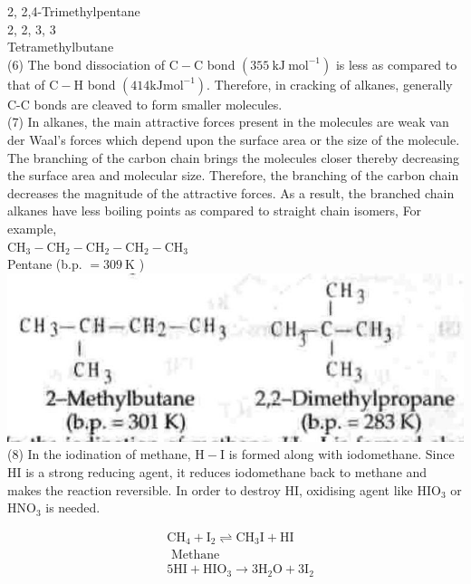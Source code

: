 \documentclass[10pt]{article}
\begin{document}
2, 2,4-Trimethylpentane\\
2, 2, 3, 3\\
Tetramethylbutane\\
(6) The bond dissociation of $\mathrm{C}-\mathrm{C}$ bond $\left(355 \mathrm{~kJ} \mathrm{~mol}^{-1}\right)$ is less as compared to that of $\mathrm{C}-\mathrm{H}$ bond $\left(414 \mathrm{kJmol}^{-1}\right)$. Therefore, in cracking of alkanes, generally C-C bonds are cleaved to form smaller molecules.\\
(7) In alkanes, the main attractive forces present in the molecules are weak van der Waal's forces which depend upon the surface area or the size of the molecule. The branching of the carbon chain brings the molecules closer thereby decreasing the surface area and molecular size. Therefore, the branching of the carbon chain decreases the magnitude of the attractive forces. As a result, the branched chain alkanes have less boiling points as compared to straight chain isomers, For example,\\
$\mathrm{CH}_{3}-\mathrm{CH}_{2}-\mathrm{CH}_{2}-\mathrm{CH}_{2}-\mathrm{CH}_{3}$\\
Pentane (b.p. $=309 \mathrm{~K}$ )\\
\includegraphics[max width=\textwidth, center]{2025_01_28_8470952b98110cec3aabg-248(6)}\\
(8) In the iodination of methane, $\mathrm{H}-\mathrm{I}$ is formed along with iodomethane. Since HI is a strong reducing agent, it reduces iodomethane back to methane and makes the reaction reversible. In order to destroy HI, oxidising agent like $\mathrm{HIO}_{3}$ or $\mathrm{HNO}_{3}$ is needed.

$$
\begin{aligned}
& \mathrm{CH}_{4}+\mathrm{I}_{2} \rightleftharpoons \mathrm{CH}_{3} \mathrm{I}+\mathrm{HI} \\
& \text { Methane } \\
& 5 \mathrm{HI}+\mathrm{HIO}_{3} \rightarrow 3 \mathrm{H}_{2} \mathrm{O}+3 \mathrm{I}_{2}
\end{aligned}
$$
\end{document}
